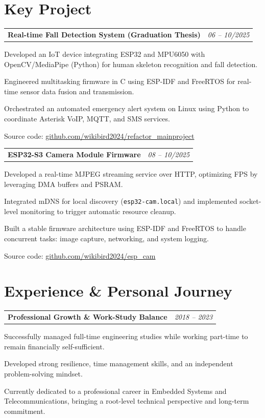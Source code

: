 \documentclass[11pt, a4paper]{article}
\makeatletter
\newcommand{\entryheader}[2]{
    \noindent\begin{tabularx}{\textwidth}{@{}X r@{}}
        \textbf{#1} & \textit{#2} \\
    \end{tabularx}\vspace{-2pt}
}
\makeatother
\begin{document}
\section{Key Project}
\entryheader{Real-time Fall Detection System (Graduation Thesis)}{06 -- 10/2025}
\begin{highlights}
    \item Developed an IoT device integrating ESP32 and MPU6050 with OpenCV/MediaPipe (Python) for human skeleton recognition and fall detection.
    \item Engineered multitasking firmware in C using ESP-IDF and FreeRTOS for real-time sensor data fusion and transmission.
    \item Orchestrated an automated emergency alert system on Linux using Python to coordinate Asterisk VoIP, MQTT, and SMS services.
    \item Source code: \href{https://github.com/wikibird2024/refactor_mainproject}{github.com/wikibird2024/refactor\_mainproject}
\end{highlights}

\medskip %

\entryheader{ESP32-S3 Camera Module Firmware}{08 -- 10/2025}
\begin{highlights}
    \item Developed a real-time MJPEG streaming service over HTTP, optimizing FPS by leveraging DMA buffers and PSRAM.
    \item Integrated mDNS for local discovery (\texttt{esp32-cam.local}) and implemented socket-level monitoring to trigger automatic resource cleanup.
    \item Built a stable firmware architecture using ESP-IDF and FreeRTOS to handle concurrent tasks: image capture, networking, and system logging.
    \item Source code: \href{https://github.com/wikibird2024/esp_cam}{github.com/wikibird2024/esp\_cam}
\end{highlights}

\section{Experience \& Personal Journey}
\entryheader{Professional Growth \& Work-Study Balance}{2018 -- 2023}
\begin{highlights}
    \item Successfully managed full-time engineering studies while working part-time to remain financially self-sufficient.
    \item Developed strong resilience, time management skills, and an independent problem-solving mindset.
    \item Currently dedicated to a professional career in Embedded Systems and Telecommunications, bringing a root-level technical perspective and long-term commitment.
\end{highlights}
\end{document}
